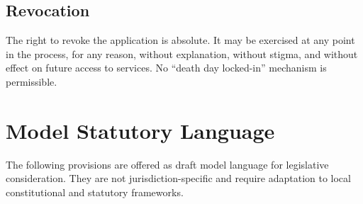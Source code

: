 \documentclass[11pt, letterpaper]{article}
\begin{document}
\subsection{Revocation}

The right to revoke the application is absolute. It may be exercised at any point in the
process, for any reason, without explanation, without stigma, and without effect on
future access to services. No ``death day locked-in'' mechanism is permissible.

\newpage

\section{Model Statutory Language}

The following provisions are offered as draft model language for legislative consideration.
They are not jurisdiction-specific and require adaptation to local constitutional and
statutory frameworks.

\medskip
\end{document}
